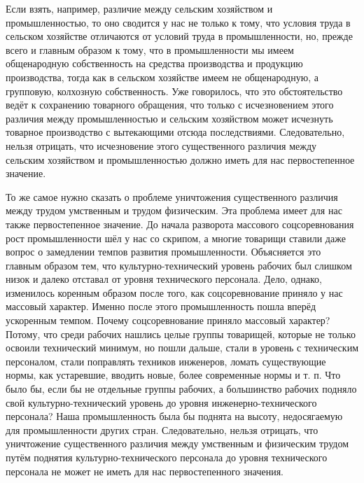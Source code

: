 \documentclass[12pt, a4paper, openany]{book}
\begin{document}
Если взять, например, различие между сельским хозяйством и промышленностью, то оно сводится у нас не только к тому, что условия труда в сельском хозяйстве отличаются от условий труда в промышленности, но, прежде всего и главным образом к тому, что в промышленности мы имеем общенародную собственность на средства производства и продукцию производства, тогда как в сельском хозяйстве имеем не общенародную, а групповую, колхозную собственность. Уже говорилось, что это обстоятельство ведёт к сохранению товарного обращения, что только с исчезновением этого различия между промышленностью и сельским хозяйством может исчезнуть товарное производство с вытекающими отсюда последствиями. Следовательно, нельзя отрицать, что исчезновение этого существенного различия между сельским хозяйством и промышленностью должно иметь для нас первостепенное значение.



То же самое нужно сказать о проблеме уничтожения существенного различия между трудом умственным и трудом физическим. Эта проблема имеет для нас также первостепенное значение. До начала разворота массового соцсоревнования рост промышленности шёл у нас со скрипом, а многие товарищи ставили даже вопрос о замедлении темпов развития промышленности. Объясняется это главным образом тем, что культурно-технический уровень рабочих был слишком низок и далеко отставал от уровня технического персонала. Дело, однако, изменилось коренным образом после того, как соцсоревнование приняло у нас массовый характер. Именно после этого промышленность пошла вперёд ускоренным темпом. Почему соцсоревнование приняло массовый характер? Потому, что среди рабочих нашлись целые группы товарищей, которые не только освоили технический минимум, но пошли дальше, стали в уровень с техническим персоналом, стали поправлять техников инженеров, ломать существующие нормы, как устаревшие, вводить новые, более современные нормы и т. п. Что было бы, если бы не отдельные группы рабочих, а большинство рабочих подняло свой культурно-технический уровень до уровня инженерно-технического персонала? Наша промышленность была бы поднята на высоту, недосягаемую для промышленности других стран. Следовательно, нельзя отрицать, что уничтожение существенного различия между умственным и физическим трудом путём поднятия культурно-технического персонала до уровня технического персонала не может не иметь для нас первостепенного значения.
\end{document}
